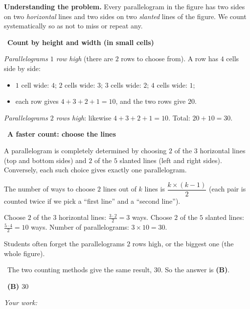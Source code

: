 \documentclass[11pt]{article}
\newif\ifsol \solfalse
\providecommand{\AnsWord}{Đáp số}
\newcommand{\StuProb}[2]{\begin{probboxS}{#1}{#2}\StuProbBody\end{probboxS}}
\newcommand{\ans}[1]{\par\smallskip{\bfseries\color{tmGreen!88!black}\AnsWord:}\ {\bfseries\color{AnsRed}#1}\par}
\newcommand{\probsol}[1]{%
  \begin{lrbox}{\solmeasure}\begin{minipage}{\dimexpr\linewidth-24pt\relax}#1\end{minipage}\end{lrbox}%
  \ifsol
    \begin{solbox}#1\end{solbox}%
  \else
    \setlength{\solht}{\dimexpr\ht\solmeasure+\dp\solmeasure+0.85cm\relax}%
    \ifdim\solht<1.35cm\setlength{\solht}{1.35cm}\fi
    \ifdim\solht>\StudentMaxWork\setlength{\solht}{\StudentMaxWork}\fi
    \par\noindent\begin{minipage}{\linewidth}%
    \expandafter\StuProb\StuProbArgs
    \begin{tcolorbox}[colback=white,colframe=Line,boxrule=0.8pt,arc=5pt,
      left=8pt,right=8pt,top=4pt,bottom=4pt,height=\solht]{\footnotesize\color{Slate}\itshape\WorkWord}\end{tcolorbox}%
    \end{minipage}\par\medskip
  \fi}
\newlength{\StudentMaxWork}\setlength{\StudentMaxWork}{4.5cm}
\newcommand{\step}[2]{\par\smallskip\noindent{\bfseries\color{tmBlue!85!black}\StepWord~#1.}\ {\bfseries #2}\par\nopagebreak}
\newcommand{\verify}[1]{\par\smallskip\noindent{\bfseries\color{tmGreen!80!black}\faCheckCircle\ \CheckWord}\ #1\par}
\def\WorkWord{Your work:}
\def\AnsWord{Answer}
\def\StepWord{Step}
\def\CheckWord{Check:}
\begin{document}
\probsol{
\textbf{Understanding the problem.} Every parallelogram in the figure has two sides on two \emph{horizontal}
lines and two sides on two \emph{slanted} lines of the figure. We count systematically so as not to miss or
repeat any.

\step{1}{Count by height and width (in small cells)}
\emph{Parallelograms $1$ row high} (there are $2$ rows to choose from). A row has $4$ cells side by side:
\begin{itemize}[leftmargin=1.4em,itemsep=1pt]
\item $1$ cell wide: $4$; $2$ cells wide: $3$; $3$ cells wide: $2$; $4$ cells wide: $1$;
\item each row gives $4+3+2+1=10$, and the two rows give $20$.
\end{itemize}
\emph{Parallelograms $2$ rows high}: likewise $4+3+2+1=10$. Total: $20+10=30$.

\step{2}{A faster count: choose the lines}
\begin{proofbox}A parallelogram is completely determined by choosing $2$ of the $3$ horizontal lines (top and
bottom sides) and $2$ of the $5$ slanted lines (left and right sides). Conversely, each such choice gives exactly
one parallelogram.\end{proofbox}
\begin{recallbox}The number of ways to choose $2$ lines out of $k$ lines is $\dfrac{k\times(k-1)}{2}$ (each pair
is counted twice if we pick a ``first line'' and a ``second line'').\end{recallbox}
Choose $2$ of the $3$ horizontal lines: $\tfrac{3\cdot 2}{2}=3$ ways. Choose $2$ of the $5$ slanted lines:
$\tfrac{5\cdot4}{2}=10$ ways. Number of parallelograms: $3\times 10=30$.

\begin{warnbox}Students often forget the parallelograms $2$ rows high, or the biggest one (the whole
figure).\end{warnbox}
\verify{The two counting methods give the same result, $30$. So the answer is \textbf{(B)}.}
\ans{(B) $30$}
}
\end{document}
